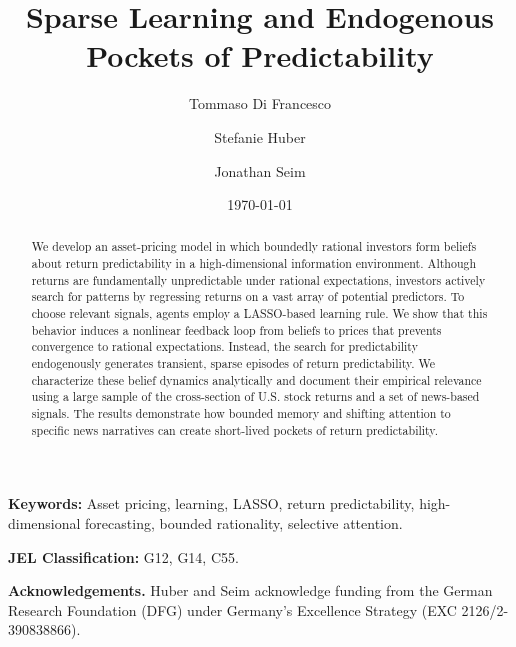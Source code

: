 \documentclass[11pt]{article}
\title{\textbf{Sparse Learning and Endogenous Pockets of Predictability}}
\author[1]{Tommaso Di Francesco}
\author[1]{Stefanie Huber}
\author[2]{Jonathan Seim}
\affil[1]{University of Bonn}
\affil[2]{University of Cologne}
\date{\today}
\begin{document}
\maketitle

\begin{abstract}
\noindent
We develop an asset-pricing model in which boundedly rational investors form beliefs about return predictability in a high-dimensional information environment. 
Although returns are fundamentally unpredictable under rational expectations, investors actively search for patterns by regressing returns on a vast array of potential predictors. 
To choose relevant signals, agents employ a LASSO-based learning rule.
We show that this behavior induces a nonlinear feedback loop from beliefs to prices that prevents convergence to rational expectations.
Instead, the search for predictability endogenously generates transient, sparse episodes of return predictability.
We characterize these belief dynamics analytically and document their empirical relevance using a large sample of the cross-section of U.S. stock returns and a set of news-based signals.
The results demonstrate how bounded memory and shifting attention to specific news narratives can create short-lived pockets of return predictability.
\end{abstract}

\vspace{0.5cm}

\noindent\textbf{Keywords:} Asset pricing, learning, LASSO, return predictability, high-dimensional forecasting, bounded rationality, selective attention. 

\noindent\textbf{JEL Classification:} G12, G14, C55.

\vspace{1.0cm}

\noindent\textbf{Acknowledgements.}
Huber and Seim acknowledge funding from the German Research Foundation (DFG) under Germany’s Excellence Strategy (EXC 2126/2-390838866).

\newpage












\newpage

\newpage
\appendix





\end{document}
